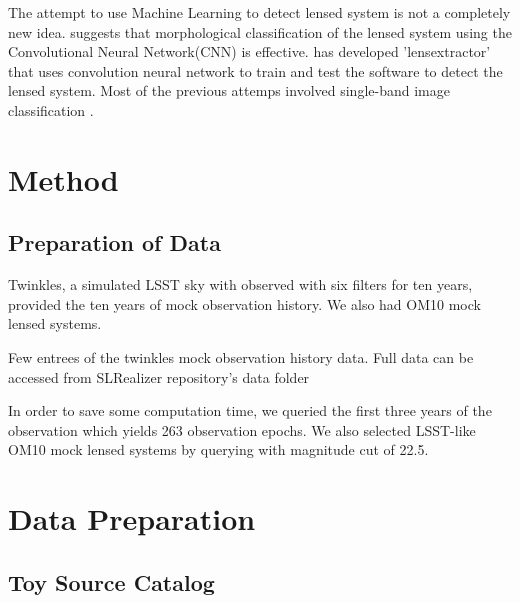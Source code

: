 \documentclass[\docopts]{\docclass}
\begin{document}
The attempt to use Machine Learning to detect lensed system is not a completely new idea. \citep{convolution_neural_network} suggests that morphological classification of the lensed system using the Convolutional Neural Network(CNN) is effective. \citep{LensExtractor} has developed 'lensextractor' that uses convolution neural network to train and test the software to detect the lensed system. Most of the previous attemps involved single-band image classification \cite{LensExtractor} \cite{convolution_neural_network}.



\section{Method}
\label{sec:method}

\subsection{Preparation of Data}
\label{subsec:dataprep}

Twinkles, a simulated LSST sky with observed with six filters for ten years, provided the ten years of mock observation history. We also had OM10 mock lensed systems. 

\begin{table}[!h]
\caption{Few entrees of the twinkles mock observation history data. Full data can be accessed from SLRealizer repository's data folder}
\end{table}

In order to save some computation time, we queried the first three years of the observation which yields 263 observation epochs. We also selected LSST-like OM10 mock lensed systems by querying with magnitude cut of 22.5. 


\section{Data Preparation}
\label{sssec:catalog}
\subsection{Toy Source Catalog}

\label{sssec:toysource}
\end{document}
